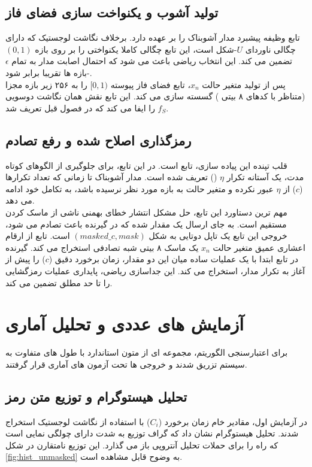 \documentclass[12pt]{report}
\begin{document}
\subsection{تولید آشوب و یکنواخت سازی فضای فاز}
تابع  وظیفه پیشبرد مدار آشوبناک را بر عهده دارد. برخلاف نگاشت لوجستیک که 
دارای چگالی ناوردای $U$-شکل است، این تابع چگالی کاملا یکنواختی را بر روی بازه $(0, 1)$ تضمین 
می کند. این انتخاب ریاضی باعث می شود که احتمال اصابت مدار به تمام $\epsilon$-بازه ها تقریبا 
برابر شود. 
\\\noindent
پس از تولید متغیر حالت $x_n$، تابع  فضای فاز پیوسته $[0, 1)$ را به 
۲۵۶ زیر بازه مجزا (متناظر با کدهای ۸ بیتی ) گسسته سازی می کند. این تابع نقش همان 
نگاشت دوسویی $f_S$ را ایفا می کند که در فصول قبل 
تعریف شد.

\subsection{رمزگذاری اصلاح شده و رفع تصادم}
قلب تپنده این پیاده سازی، تابع  است. در این تابع، برای جلوگیری از 
الگوهای کوتاه مدت، یک آستانه تکرار $\eta$ () تعریف شده است. مدار آشوبناک تا زمانی که 
تعداد تکرارها ($c$) از $\eta$ عبور نکرده و متغیر حالت به بازه مورد نظر نرسیده باشد، به تکامل 
خود ادامه می دهد.
\\\noindent
مهم ترین دستاورد این تابع، حل مشکل انتشار خطای بهمنی ناشی 
از ماسک کردن مستقیم است. به جای ارسال یک مقدار  شده که در گیرنده باعث تصادم می شود، 
خروجی این تابع یک تاپل دوتایی به شکل $(masked\_c, mask)$ است. 
تابع  از ارقام اعشاری عمیق متغیر حالت $x_n$ یک ماسک ۸ بیتی شبه تصادفی 
استخراج می کند. گیرنده در تابع  ابتدا با یک عملیات  ساده میان این 
دو مقدار، زمان برخورد دقیق ($c$) را پیش از آغاز به تکرار مدار، استخراج می کند. این جداسازی 
ریاضی، پایداری عملیات رمزگشایی را تا حد مطلق تضمین می کند.

\section{آزمایش های عددی و تحلیل آماری}
برای اعتبارسنجی الگوریتم، مجموعه ای از متون استاندارد با طول های متفاوت به سیستم تزریق شدند 
و خروجی ها تحت آزمون های آماری قرار گرفتند.

\subsection{تحلیل هیستوگرام و توزیع متن رمز}
در آزمایش اول، مقادیر خام زمان برخورد ($C_i$) با استفاده از نگاشت لوجستیک استخراج شدند. تحلیل 
هیستوگرام نشان داد که گراف توزیع به شدت دارای چولگی 
نمایی است که راه را برای حملات تحلیل آنتروپی باز 
می گذارد. این توزیع نامتقارن در شکل \ref{fig:hist_unmasked} به وضوح قابل مشاهده است.
\end{document}
